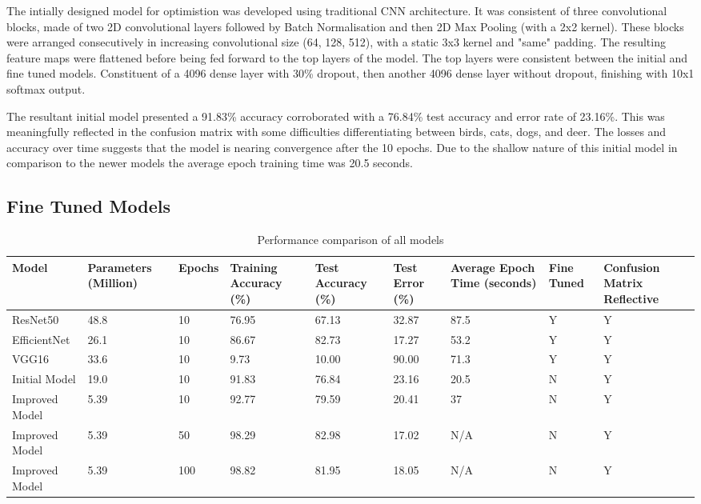\documentclass[10pt,twocolumn,letterpaper]{article}
\begin{document}
The intially designed model for optimistion was developed using traditional CNN architecture. It was consistent of three convolutional blocks, made of two 2D convolutional layers followed by Batch Normalisation and then 2D Max Pooling (with a 2x2 kernel). These blocks were arranged consecutively in increasing convolutional size (64, 128, 512), with a static 3x3 kernel and "same" padding. The resulting feature maps were flattened before being fed forward to the top layers of the model. The top layers were consistent between the initial and fine tuned models. Constituent of a 4096 dense layer with 30\% dropout, then another 4096 dense layer without dropout, finishing with 10x1 softmax output. 

The resultant initial model presented a 91.83\% accuracy corroborated with a 76.84\% test accuracy and error rate of 23.16\%. This was meaningfully reflected in the confusion matrix with some difficulties differentiating between birds, cats, dogs, and deer. The losses and accuracy over time suggests that the model is nearing convergence after the 10 epochs. Due to the shallow nature of this initial model in comparison to the newer models the average epoch training time was 20.5 seconds.

\subsection{Fine Tuned Models}

\begin{table}[t]
\centering
\begin{tabular}{|L|L|L|L|L|L|L|L|L|}
\hline
\textbf{Model} & \textbf{Parameters (Million)} & \textbf{Epochs} & \textbf{Training Accuracy (\%)} & \textbf{Test Accuracy (\%)} & \textbf{Test Error (\%)} & \textbf{Average Epoch Time (seconds)} & \textbf{Fine Tuned} & \textbf{Confusion Matrix Reflective} \\ \hline \hline
ResNet50 & 48.8 & 10 & 76.95 & 67.13 & 32.87 & 87.5 & Y & Y \\ \hline
EfficientNet & 26.1 & 10 & 86.67 & 82.73 & 17.27 & 53.2 & Y & Y \\ \hline
VGG16 & 33.6 & 10 & 9.73 & 10.00 & 90.00 & 71.3 & Y & Y \\ \hline
Initial Model & 19.0 & 10 & 91.83 & 76.84 & 23.16 & 20.5 & N & Y \\ \hline
Improved Model & 5.39 & 10 & 92.77 & 79.59 & 20.41 & 37 & N & Y \\ \hline
Improved Model & 5.39 & 50 & 98.29 & 82.98 & 17.02 & N/A & N & Y \\ \hline
Improved Model & 5.39 & 100 & 98.82 & 81.95 & 18.05 & N/A & N & Y \\ \hline
\end{tabular}
\caption{Performance comparison of all models}
\label{tab:model_performance}
\end{table}
\end{document}
